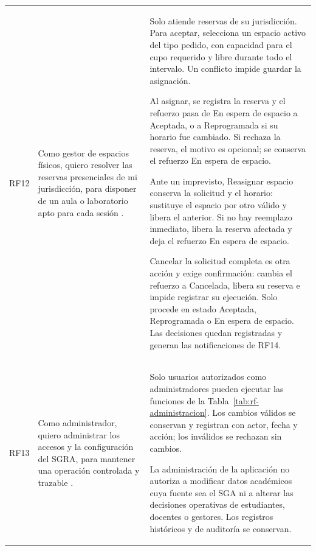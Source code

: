 \begin{longtable}{@{}p{}p{}p{}@{}}
RF12 &
Como gestor de espacios físicos, quiero resolver las
reservas presenciales de mi jurisdicción, para disponer
de un aula o laboratorio apto para cada sesión
\cite{SGRA-documentacion-original}. &
Solo atiende reservas de su jurisdicción. Para aceptar,
selecciona un espacio activo del tipo pedido, con capacidad
para el cupo requerido y libre durante todo el intervalo.
Un conflicto impide guardar la asignación.
\par\smallskip\noindent
Al asignar, se registra la reserva y el refuerzo pasa de
En espera de espacio a Aceptada, o a Reprogramada si su
horario fue cambiado. Si rechaza la reserva, el motivo es
opcional; se conserva el refuerzo En espera de espacio.
\par\smallskip\noindent
Ante un imprevisto, Reasignar espacio conserva la solicitud
y el horario: sustituye el espacio por otro válido y libera
el anterior. Si no hay reemplazo inmediato, libera la reserva
afectada y deja el refuerzo En espera de espacio.
\par\smallskip\noindent
Cancelar la solicitud completa es otra acción y exige
confirmación: cambia el refuerzo a Cancelada, libera
su reserva e impide registrar su ejecución.
Solo procede en estado Aceptada, Reprogramada o En espera
de espacio. Las decisiones quedan
registradas y generan las notificaciones de RF14. \\

RF13 &
Como administrador, quiero administrar los accesos y
la configuración del SGRA, para mantener una operación
controlada y trazable \cite{SGRA-documentacion-original}. &
Solo usuarios autorizados como administradores pueden
ejecutar las funciones de la Tabla~\ref{tab:rf-administracion}.
Los cambios válidos se conservan y registran con actor,
fecha y acción; los inválidos se rechazan sin cambios.
\par\smallskip\noindent
La administración de la aplicación no autoriza a modificar
datos académicos cuya fuente sea el SGA ni a alterar
las decisiones operativas de estudiantes, docentes o gestores.
Los registros históricos y de auditoría se conservan. \\


\end{longtable}
